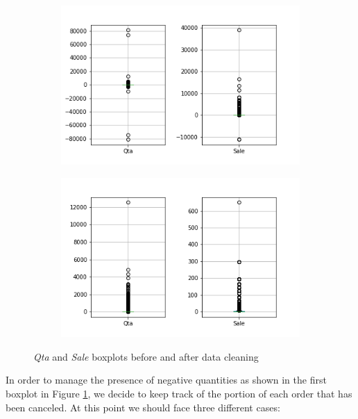 \begin{figure}
\begin{subfigure}{.49\textwidth}
\centering
\includegraphics[width=.95\textwidth]{img/boxplots_before.png}
\caption{}
\label{fig:sale_qta_boxplots_before}
\end{subfigure}
\begin{subfigure}{.49\textwidth}
\centering
\captionsetup{justification=centering}
\includegraphics[width=.95\textwidth]{img/boxplots_after.png}
\caption{}
\label{fig:sale_qta_boxplots_after}
\end{subfigure}
\caption{\emph{Qta} and \emph{Sale} boxplots before and after data cleaning}
\end{figure}

In order to manage the presence of negative quantities as shown in the first boxplot in Figure \ref{fig:sale_qta_boxplots_before}, we decide to keep track of the portion of each order that has been canceled. At this point we should face three different cases:

